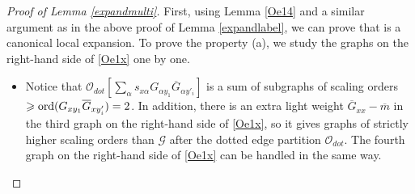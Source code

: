 \documentclass{article}
\newcommand{\1}{\mathds{1}}
\numberwithin{equation}{section}
\newcommand{\ord}{{\rm{ord}}}
\newcommand{\al}{\alpha}
\renewcommand{\cal}{\mathcal}
\renewcommand{\geq}{\geqslant}
\renewcommand{\ge}{\geq}
\theoremstyle{plain} %
\theoremstyle{remark}
\newtheorem{remark}[theorem]{Remark}
\begin{document}

\begin{proof} [Proof of Lemma \ref{expandmulti}]
First, using Lemma \ref{Oe14} and a similar argument as in the above proof of Lemma \ref{expandlabel}, we can prove that \smash{${\cal O}_{multi-e}^{(x)}[\cal G]$} is a canonical local expansion. To prove the property (a), we study the graphs on the right-hand side of \eqref{Oe1x} one by one. 
 \begin{itemize}

 
\item[(1)] %
Notice that {$ \cal O_{dot}\left[ \sum_\al s_{x\al }G_{\al y_1} \overline G_{\al y'_i}\right]$} is a sum of subgraphs of scaling orders $\ge \ord(G_{x y_1} \overline G_{xy_i'}) =2$. In addition, there is an extra light weight $\overline G_{xx} -\overline m$ in the third graph on the right-hand side of \eqref{Oe1x}, so it gives graphs of strictly higher scaling orders than $\cal G$ after the dotted edge partition $\cal O_{dot}$. The fourth graph on the right-hand side of \eqref{Oe1x} can be handled in the same way.


\end{itemize}
\end{proof}
\end{document}
